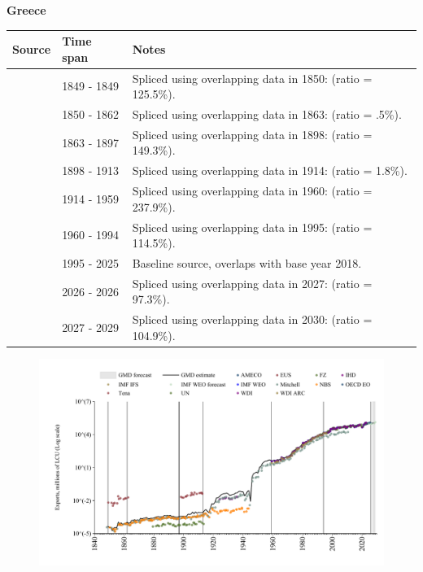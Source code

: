 \documentclass[12pt,a4paper,landscape]{article}
\begin{document}
\begin{adjustbox}{max totalsize={\paperwidth}{\paperheight},center}
\begin{minipage}[t][\textheight][t]{\textwidth}
\vspace*{0.5cm}
{}
\begin{center}
{\Large\bfseries Greece}
\end{center}
\vspace{0.5cm}
\begin{table}[H]
\centering
\small
\begin{tabular}{|l|l|l|}
\hline
\textbf{Source} & \textbf{Time span} & \textbf{Notes} \\
\hline
\rowcolor{white}\cite{Mitchell}& 1849 - 1849 &Spliced using overlapping data in 1850: (ratio = 125.5\%).\\
\rowcolor{lightgray}\cite{Tena}& 1850 - 1862 &Spliced using overlapping data in 1863: (ratio = .5\%).\\
\rowcolor{white}\cite{Mitchell}& 1863 - 1897 &Spliced using overlapping data in 1898: (ratio = 149.3\%).\\
\rowcolor{lightgray}\cite{Tena}& 1898 - 1913 &Spliced using overlapping data in 1914: (ratio = 1.8\%).\\
\rowcolor{white}\cite{Mitchell}& 1914 - 1959 &Spliced using overlapping data in 1960: (ratio = 237.9\%).\\
\rowcolor{lightgray}\cite{AMECO}& 1960 - 1994 &Spliced using overlapping data in 1995: (ratio = 114.5\%).\\
\rowcolor{white}\cite{OECD_EO}& 1995 - 2025 &Baseline source, overlaps with base year 2018.\\
\rowcolor{lightgray}\cite{AMECO}& 2026 - 2026 &Spliced using overlapping data in 2027: (ratio = 97.3\%).\\
\rowcolor{white}\cite{IMF_WEO_forecast}& 2027 - 2029 &Spliced using overlapping data in 2030: (ratio = 104.9\%).\\
\hline
\end{tabular}
\end{table}
\begin{figure}[H]
\centering
\includegraphics[width=\textwidth,height=0.6\textheight,keepaspectratio]{graphs/GRC_exports.pdf}
\end{figure}
\end{minipage}
\end{adjustbox}
\end{document}
